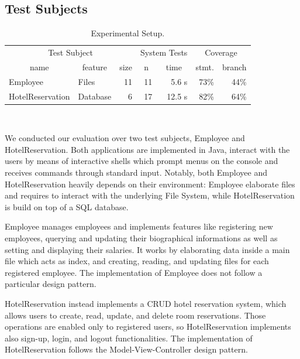\documentclass[10pt,conference]{IEEEtran}
\begin{document}
\subsection{Test Subjects}

\begin{table}[tp]
\centering
\caption{Experimental Setup.}
\begin{tabular}{l l r r r r r }
\toprule
\multicolumn{3}{c}{Test Subject} & \multicolumn{2}{c}{System Tests}  & \multicolumn{2}{c}{Coverage} \\
\cmidrule(rl){1-3}
\cmidrule(rl){4-5}
\cmidrule(rl){6-7}

\multicolumn{1}{c}{name} &
\multicolumn{1}{c}{feature} & 
\multicolumn{1}{c}{size} & %

	\multicolumn{1}{c}{n} &
	\multicolumn{1}{c}{time} &
	
	\multicolumn{1}{c}{stmt.} &
	\multicolumn{1}{c}{branch} \\
\midrule
\footnotesize Employee & Files & 11 & 11 & 5.6 s& 73\%& 44\% \\
\footnotesize HotelReservation & Database & 6 & 17  & 12.5 s & 82\% & 64\%\\
\bottomrule
\end{tabular} \\
\end{table}

We conducted our evaluation over two test subjects, Employee and HotelReservation. 
%
Both applications are implemented in Java, %
interact with the users by means of interactive shells which prompt
menus on the console and receives commands through standard input. 
Notably, both Employee and HotelReservation heavily depends on their environment:
Employee elaborate files and requires to interact with the underlying File System, while
 HotelReservation is build on top of a SQL database.

Employee manages employees and implements features like registering new employees,
querying and updating their biographical informations as well as setting and displaying
their salaries. It works by elaborating data inside a main file which acts as index, and creating,
reading, and updating files for each registered employee. The implementation of Employee
does not follow a particular design pattern.

HotelReservation instead implements a CRUD hotel reservation system, which allows users to
create, read, update, and delete room reservations. Those operations are enabled only to registered
users, so HotelReservation implements also sign-up, login, and logout functionalities.
The implementation of HotelReservation follows the Model-View-Controller design pattern.
\end{document}
